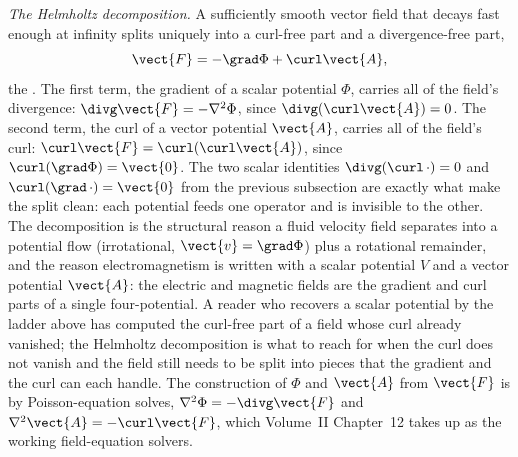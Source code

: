 \begin{mastery}
\textit{The Helmholtz decomposition.} A sufficiently smooth vector
field that decays fast enough at infinity splits uniquely into a
curl-free part and a divergence-free part,
\[
\vect{F} = -\grad\Phi + \curl\vect{A},
\]
the . The first term, the gradient of
a scalar potential $\Phi$, carries all of the field's divergence:
$\divg\vect{F} = -\nabla^{2}\Phi$, since $\divg(\curl\vect{A}) = 0$.
The second term, the curl of a vector potential $\vect{A}$, carries
all of the field's curl: $\curl\vect{F} = \curl(\curl\vect{A})$, since
$\curl(\grad\Phi) = \vect{0}$. The two scalar identities
$\divg(\curl\,\cdot) = 0$ and $\curl(\grad\,\cdot) = \vect{0}$ from the
previous subsection are exactly what make the split clean: each
potential feeds one operator and is invisible to the other. The
decomposition is the structural reason a fluid velocity field separates
into a potential flow (irrotational, $\vect{v} = \grad\Phi$) plus a
rotational remainder, and the reason electromagnetism is written with a
scalar potential $V$ and a vector potential $\vect{A}$: the electric
and magnetic fields are the gradient and curl parts of a single
four-potential. A reader who recovers a scalar potential by the ladder
above has computed the curl-free part of a field whose curl already
vanished; the Helmholtz decomposition is what to reach for when the
curl does not vanish and the field still needs to be split into pieces
that the gradient and the curl can each handle. The construction of
$\Phi$ and $\vect{A}$ from $\vect{F}$ is by Poisson-equation solves,
$\nabla^{2}\Phi = -\divg\vect{F}$ and $\nabla^{2}\vect{A} =
-\curl\vect{F}$, which Volume~II Chapter~12 takes up as the working
field-equation solvers.
\end{mastery}

